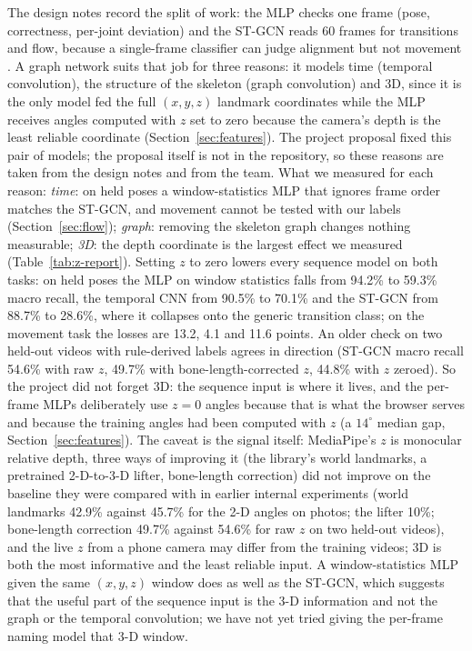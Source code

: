  The design notes record the split of work: the MLP checks one frame (pose, correctness, per-joint deviation) and the ST-GCN reads 60 frames for transitions and flow, because a single-frame classifier can judge alignment but not movement \cite{yan2018stgcn}. A graph network suits that job for three reasons: it models time (temporal convolution), the structure of the skeleton (graph convolution) and 3D, since it is the only model fed the full $(x,y,z)$ landmark coordinates while the MLP receives angles computed with $z$ set to zero because the camera's depth is the least reliable coordinate (Section~\ref{sec:features}). The project proposal fixed this pair of models; the proposal itself is not in the repository, so these reasons are taken from the design notes and from the team. What we measured for each reason: \emph{time}: on held poses a window-statistics MLP that ignores frame order matches the ST-GCN, and movement cannot be tested with our labels (Section~\ref{sec:flow}); \emph{graph}: removing the skeleton graph changes nothing measurable; \emph{3D}: the depth coordinate is the largest effect we measured (Table~\ref{tab:z-report}). Setting $z$ to zero lowers every sequence model on both tasks: on held poses the MLP on window statistics falls from 94.2\% to 59.3\% macro recall, the temporal CNN from 90.5\% to 70.1\% and the ST-GCN from 88.7\% to 28.6\%, where it collapses onto the generic transition class; on the movement task the losses are 13.2, 4.1 and 11.6 points. An older check on two held-out videos with rule-derived labels agrees in direction (ST-GCN macro recall 54.6\% with raw $z$, 49.7\% with bone-length-corrected $z$, 44.8\% with $z$ zeroed). So the project did not forget 3D: the sequence input is where it lives, and the per-frame MLPs deliberately use $z{=}0$ angles because that is what the browser serves and because the training angles had been computed with $z$ (a $14^\circ$ median gap, Section~\ref{sec:features}). The caveat is the signal itself: MediaPipe's $z$ is monocular relative depth, three ways of improving it (the library's world landmarks, a pretrained 2-D-to-3-D lifter, bone-length correction) did not improve on the baseline they were compared with in earlier internal experiments (world landmarks 42.9\% against 45.7\% for the 2-D angles on photos; the lifter 10\%; bone-length correction 49.7\% against 54.6\% for raw $z$ on two held-out videos), and the live $z$ from a phone camera may differ from the training videos; 3D is both the most informative and the least reliable input. A window-statistics MLP given the same $(x,y,z)$ window does as well as the ST-GCN, which suggests that the useful part of the sequence input is the 3-D information and not the graph or the temporal convolution; we have not yet tried giving the per-frame naming model that 3-D window.

